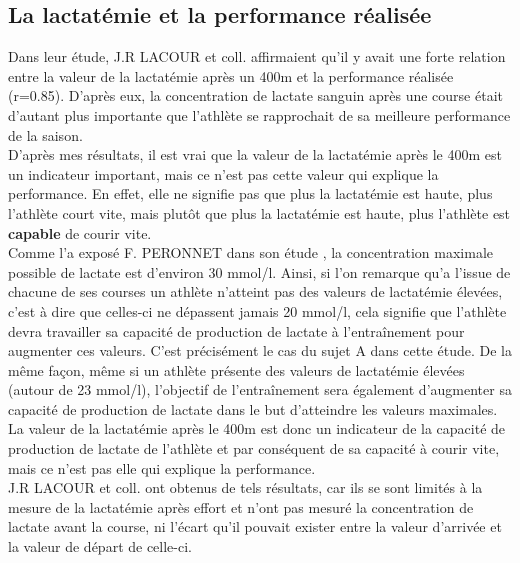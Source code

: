         
        \subsection{La lactatémie et la performance réalisée}
        
            
            Dans leur étude, J.R LACOUR et coll. \cite{lacour90} affirmaient qu'il y avait une forte relation entre la valeur de la lactatémie après un 400m et la performance réalisée (r=0.85). D'après eux, la concentration de lactate sanguin après une course était d'autant plus importante que l'athlète se rapprochait de sa meilleure performance de la saison. \\
            
            D'après mes résultats, il est vrai que la valeur de la lactatémie après le 400m est un indicateur important, mais ce n'est pas cette valeur qui explique la performance. En effet, elle ne signifie pas que plus la lactatémie est haute, plus l'athlète court vite, mais plutôt que plus la lactatémie est haute, plus l'athlète est \textbf{capable} de courir vite.  \\
            
            Comme l'a exposé F. PERONNET dans son étude \cite{peronnet13}, la concentration maximale possible de lactate est d'environ 30 mmol/l. Ainsi, si l'on remarque qu'a l'issue de chacune de ses courses un athlète n'atteint pas des valeurs de lactatémie élevées, c'est à dire que celles-ci ne dépassent jamais 20 mmol/l, cela signifie que l'athlète devra travailler sa capacité de production de lactate à l'entraînement pour augmenter ces valeurs. C'est précisément le cas du sujet A dans cette étude. De la même façon, même si un athlète présente des valeurs de lactatémie élevées (autour de 23 mmol/l), l'objectif de l'entraînement sera également d'augmenter sa capacité de production de lactate dans le but d'atteindre les valeurs maximales. \\
            
            La valeur de la lactatémie après le 400m est donc un indicateur de la capacité de production de lactate de l'athlète et par conséquent de sa capacité à courir vite, mais ce n'est pas elle qui explique la performance.\\ 
            
            J.R LACOUR et coll. ont obtenus de tels résultats, car ils se sont limités à la mesure de la lactatémie après effort et n'ont pas mesuré la concentration de lactate avant la course, ni l'écart qu'il pouvait exister entre la valeur d'arrivée et la valeur de départ de celle-ci.\\
            
